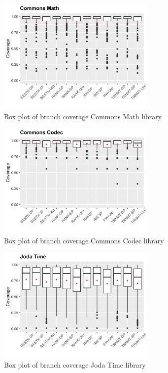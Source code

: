 \documentclass[sigconf]{acmart}
\begin{document}
\begin{figure}[h]
  \centering
  \includegraphics[width=3in]{../output/commons-math-boxplot.png}
  \caption{Box plot of branch coverage Commons Math library}
  \label{fig:boxplot2}
\end{figure}

\begin{figure}[h]
  \centering
  \includegraphics[width=3in]{../output/commons-codec-boxplot.png}
  \caption{Box plot of branch coverage Commons Codec library}
  \label{fig:boxplot3}
\end{figure}

\begin{figure}[h]
  \centering
  \includegraphics[width=3in]{../output/joda-time-boxplot.png}
  \caption{Box plot of branch coverage Joda Time library}
  \label{fig:boxplot4}
\end{figure}
\end{document}
